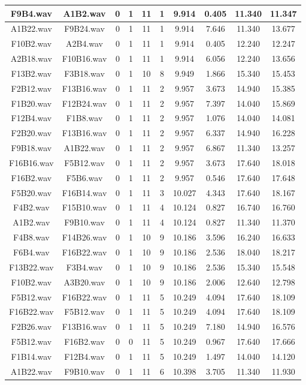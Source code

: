 \documentclass[11pt,a4paper]{book}
\begin{document}
\begin{longtable}[c]{|c|c|c|c|c|c|c|c|c|c|}
F9B4.wav&A1B2.wav&0&1&11&1&9.914&0.405&11.340&11.347\\ \hline
A1B22.wav&F9B24.wav&0&1&11&1&9.914&7.646&11.340&13.677\\ \hline
F10B2.wav&A2B4.wav&0&1&11&1&9.914&0.405&12.240&12.247\\ \hline
A2B18.wav&F10B16.wav&0&1&11&1&9.914&6.056&12.240&13.656\\ \hline
F13B2.wav&F3B18.wav&0&1&10&8&9.949&1.866&15.340&15.453\\ \hline
F2B12.wav&F13B16.wav&0&1&11&2&9.957&3.673&14.940&15.385\\ \hline
F1B20.wav&F12B24.wav&0&1&11&2&9.957&7.397&14.040&15.869\\ \hline
F12B4.wav&F1B8.wav&0&1&11&2&9.957&1.076&14.040&14.081\\ \hline
F2B20.wav&F13B16.wav&0&1&11&2&9.957&6.337&14.940&16.228\\ \hline
F9B18.wav&A1B22.wav&0&1&11&2&9.957&6.867&11.340&13.257\\ \hline
F16B16.wav&F5B12.wav&0&1&11&2&9.957&3.673&17.640&18.018\\ \hline
F16B2.wav&F5B6.wav&0&1&11&2&9.957&0.546&17.640&17.648\\ \hline
F5B20.wav&F16B14.wav&0&1&11&3&10.027&4.343&17.640&18.167\\ \hline
F4B2.wav&F15B10.wav&0&1&11&4&10.124&0.827&16.740&16.760\\ \hline
A1B2.wav&F9B10.wav&0&1&11&4&10.124&0.827&11.340&11.370\\ \hline
F4B8.wav&F14B26.wav&0&1&10&9&10.186&3.596&16.240&16.633\\ \hline
F6B4.wav&F16B22.wav&0&1&10&9&10.186&2.536&18.040&18.217\\ \hline
F13B22.wav&F3B4.wav&0&1&10&9&10.186&2.536&15.340&15.548\\ \hline
F10B2.wav&A3B20.wav&0&1&10&9&10.186&2.006&12.640&12.798\\ \hline
F5B12.wav&F16B22.wav&0&1&11&5&10.249&4.094&17.640&18.109\\ \hline
F16B22.wav&F5B12.wav&0&1&11&5&10.249&4.094&17.640&18.109\\ \hline
F2B26.wav&F13B16.wav&0&1&11&5&10.249&7.180&14.940&16.576\\ \hline
F5B12.wav&F16B2.wav&0&0&11&5&10.249&0.967&17.640&17.666\\ \hline
F1B14.wav&F12B4.wav&0&1&11&5&10.249&1.497&14.040&14.120\\ \hline
A1B22.wav&F9B10.wav&0&1&11&6&10.398&3.705&11.340&11.930\\ \hline

\end{longtable}
\end{document}
